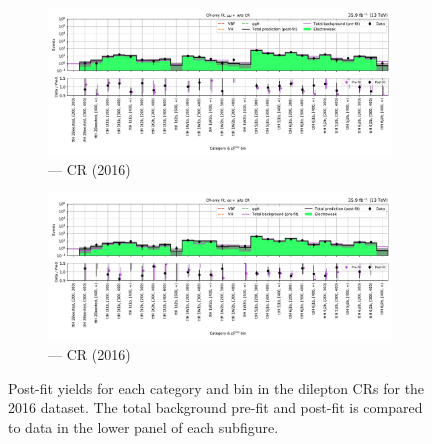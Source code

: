 \begin{figure}[htbp]
    \centering
    \begin{subfigure}[b]{\textwidth}
        \includegraphics[width=\textwidth]{chapters/higgstoinv/figures/mountain_ranges/2016/ttH/Zmumu_tree_fit_b-abs_values_ttH_cats.pdf}
        \caption{\ttH --- \doubleMuCr \gls{CR} (2016)}
    \end{subfigure}

    \begin{subfigure}[b]{\textwidth}
        \includegraphics[width=\textwidth]{chapters/higgstoinv/figures/mountain_ranges/2016/ttH/Zee_tree_fit_b-abs_values_ttH_cats.pdf}
        \caption{\ttH --- \doubleEleCr \gls{CR} (2016)}
    \end{subfigure}
    \caption[Post-fit yields for each \ttH category and \ptmiss bin in the dilepton control regions for the 2016 dataset]{Post-fit yields for each \ttH category and \ptmiss bin in the dilepton \glspl{CR} for the 2016 dataset. The total background pre-fit and post-fit is compared to data in the lower panel of each subfigure.}
    \label{fig:htoinv_mountain_range_ttH_2016_dilep_CRs}
\end{figure}

